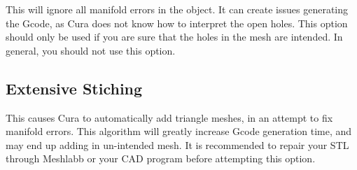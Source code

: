 This will ignore all manifold errors in the object. It can create issues generating the Gcode, as Cura does not know how to interpret the open holes. This option should only be used if you are sure that the holes in the mesh are intended. In general, you should not use this option.

\subsection{Extensive Stiching}

This causes Cura to automatically add triangle meshes, in an attempt to fix manifold errors. This algorithm will greatly increase Gcode generation time, and may end up adding in un-intended mesh. It is recommended to repair your STL through Meshlabb or your CAD program before attempting this option.
